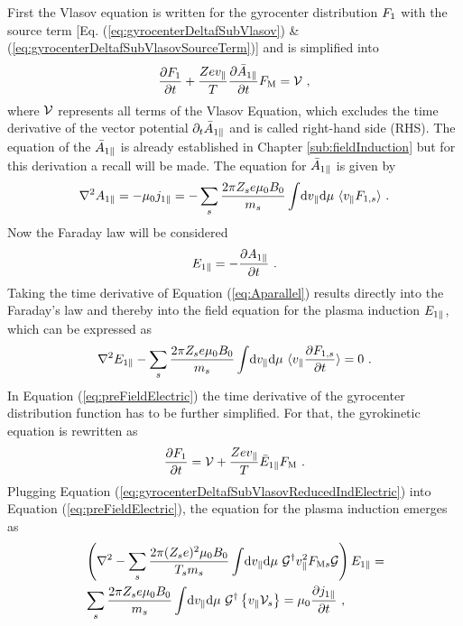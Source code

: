 First the Vlasov equation is written for the gyrocenter distribution $F_1$ with the source term [Eq. (\ref{eq:gyrocenterDeltafSubVlasov}) \& (\ref{eq:gyrocenterDeltafSubVlasovSourceTerm})] and is simplified into 
\begin{gather}
    \frac{\partial F_1}{\partial t} + \frac{Ze v_\parallel}{T}  \frac{\partial \bar{A}_{1\parallel}}{\partial t} F_\mathrm{M} = \mathcal{V}~,
    \label{eq:gyrocenterDeltafSubVlasovReduced}
\end{gather}
where $\mathcal{V}$ represents all terms of the Vlasov Equation, which excludes the time derivative of the vector potential $\partial_t \bar{A}_{1\parallel}$ and is called right-hand side (RHS). The equation of the $\bar{A}_{1\parallel}$ is already established in Chapter \ref{sub:fieldInduction} but for this derivation a recall will be made. The equation for $\bar{A}_{1\parallel}$ is given by
\begin{gather}
    \nabla^2 A_{1\parallel} = - \mu_0 j_{1\parallel} = - \sum_s \frac{2\pi Z_se \mu_0 B_0}{m_s} \int \! \mathrm{d}v_\parallel\mathrm{d}\mu ~ \langle v_\parallel F_{1,s}\rangle~.
    \label{eq:Aparallel}
\end{gather}
Now the Faraday law will be considered
\begin{gather}
	E_{1\parallel} = - \frac{\partial A_{1\parallel}}{\partial t}~.
	\label{eq:faradayLaw}
\end{gather}
Taking the time derivative of Equation (\ref{eq:Aparallel}) results directly into the Faraday's law and thereby into the field equation for the plasma induction $E_{1\parallel}$, which can be expressed as
\begin{gather}
	\nabla^2 E_{1\parallel} - \sum_s \frac{2\pi Z_se \mu_0 B_0}{m_s} \int \! \mathrm{d}v_\parallel\mathrm{d}\mu ~ \langle v_\parallel \frac{\partial F_{1,s}}{\partial t}\rangle = 0 ~.
	\label{eq:preFieldElectric}
\end{gather}
In Equation (\ref{eq:preFieldElectric}) the time derivative of the gyrocenter distribution function has to be further simplified. For that, the gyrokinetic equation is rewritten as 
\begin{gather}
	\frac{\partial F_1}{\partial t} = \mathcal{V} + \frac{Ze v_\parallel}{T} \bar{E}_{1\parallel} F_\mathrm{M}~.
	\label{eq:gyrocenterDeltafSubVlasovReducedIndElectric}
\end{gather}
Plugging Equation (\ref{eq:gyrocenterDeltafSubVlasovReducedIndElectric}) into Equation (\ref{eq:preFieldElectric}), the equation for the plasma induction emerges as
\begin{gather}
	\begin{aligned}
		&\left(\nabla^2 - \sum_s \frac{2\pi (Z_se)^2 \mu_0 B_0}{T_sm_s} \int \! \mathrm{d}v_\parallel\mathrm{d}\mu ~ \mathcal{G}^\dagger v_\parallel^2 F_{\mathrm{M}s} \mathcal{G}\right) E_{1\parallel} = \\
		&\sum_s \frac{2\pi Z_se \mu_0 B_0}{m_s}  \int \! \mathrm{d}v_\parallel\mathrm{d}\mu ~ \mathcal{G}^\dagger \left\{v_\parallel \mathcal{V}_s\right\} = \mu_0 \frac{\partial j_{1\parallel}}{\partial t}~,
	\end{aligned}
	\label{eq:fieldElectric}
\end{gather}
